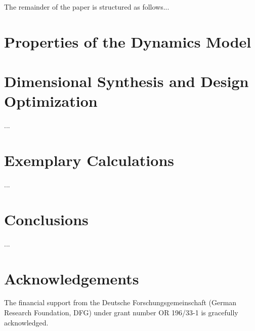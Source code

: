 \documentclass{svproc}
\begin{document}
The remainder of the paper is structured as follows...

\section{Properties of the Dynamics Model}
\label{sec:DynMdl}

\section{Dimensional Synthesis and Design Optimization}
\label{sec:DimSynth}

...

\section{Exemplary Calculations}

...

\section{Conclusions}
\label{sec:Conclusion}

...

\section*{Acknowledgements}

The financial support from the Deutsche Forschungsgemeinschaft (German Research Foundation, DFG) under grant number OR 196/33-1 is gracefully acknowledged.



\end{document}
